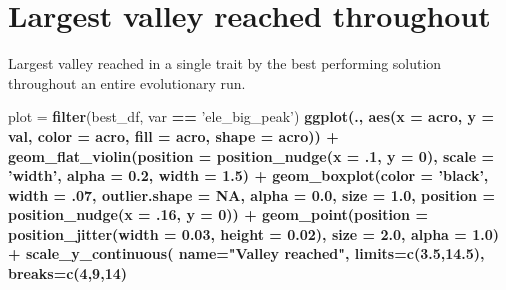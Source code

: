 \documentclass[]{book}
\newenvironment{Shaded}{\begin{snugshade}}{\end{snugshade}}
\newcommand{\DataTypeTok}[1]{\textcolor[rgb]{0.13,0.29,0.53}{#1}}
\newcommand{\DecValTok}[1]{\textcolor[rgb]{0.00,0.00,0.81}{#1}}
\newcommand{\FloatTok}[1]{\textcolor[rgb]{0.00,0.00,0.81}{#1}}
\newcommand{\KeywordTok}[1]{\textcolor[rgb]{0.13,0.29,0.53}{\textbf{#1}}}
\newcommand{\NormalTok}[1]{#1}
\newcommand{\OperatorTok}[1]{\textcolor[rgb]{0.81,0.36,0.00}{\textbf{#1}}}
\newcommand{\OtherTok}[1]{\textcolor[rgb]{0.56,0.35,0.01}{#1}}
\newcommand{\StringTok}[1]{\textcolor[rgb]{0.31,0.60,0.02}{#1}}
\begin{document}
\hypertarget{largest-valley-reached-throughout-3}{%
\section{Largest valley reached throughout}\label{largest-valley-reached-throughout-3}}

Largest valley reached in a single trait by the best performing solution throughout an entire evolutionary run.

\begin{Shaded}
\begin{Highlighting}[]
\NormalTok{plot =}\StringTok{ }\KeywordTok{filter}\NormalTok{(best_df, var }\OperatorTok{==}\StringTok{ 'ele_big_peak'}\NormalTok{) }\OperatorTok{%>%}
\StringTok{  }\KeywordTok{ggplot}\NormalTok{(., }\KeywordTok{aes}\NormalTok{(}\DataTypeTok{x =}\NormalTok{ acro, }\DataTypeTok{y =}\NormalTok{ val, }\DataTypeTok{color =}\NormalTok{ acro, }\DataTypeTok{fill =}\NormalTok{ acro, }\DataTypeTok{shape =}\NormalTok{ acro)) }\OperatorTok{+}
\StringTok{  }\KeywordTok{geom_flat_violin}\NormalTok{(}\DataTypeTok{position =} \KeywordTok{position_nudge}\NormalTok{(}\DataTypeTok{x =} \FloatTok{.1}\NormalTok{, }\DataTypeTok{y =} \DecValTok{0}\NormalTok{), }\DataTypeTok{scale =} \StringTok{'width'}\NormalTok{, }\DataTypeTok{alpha =} \FloatTok{0.2}\NormalTok{, }\DataTypeTok{width =} \FloatTok{1.5}\NormalTok{) }\OperatorTok{+}
\StringTok{  }\KeywordTok{geom_boxplot}\NormalTok{(}\DataTypeTok{color =} \StringTok{'black'}\NormalTok{, }\DataTypeTok{width =} \FloatTok{.07}\NormalTok{, }\DataTypeTok{outlier.shape =} \OtherTok{NA}\NormalTok{, }\DataTypeTok{alpha =} \FloatTok{0.0}\NormalTok{, }\DataTypeTok{size =} \FloatTok{1.0}\NormalTok{, }\DataTypeTok{position =} \KeywordTok{position_nudge}\NormalTok{(}\DataTypeTok{x =} \FloatTok{.16}\NormalTok{, }\DataTypeTok{y =} \DecValTok{0}\NormalTok{)) }\OperatorTok{+}
\StringTok{  }\KeywordTok{geom_point}\NormalTok{(}\DataTypeTok{position =} \KeywordTok{position_jitter}\NormalTok{(}\DataTypeTok{width =} \FloatTok{0.03}\NormalTok{, }\DataTypeTok{height =} \FloatTok{0.02}\NormalTok{), }\DataTypeTok{size =} \FloatTok{2.0}\NormalTok{, }\DataTypeTok{alpha =} \FloatTok{1.0}\NormalTok{) }\OperatorTok{+}
\StringTok{  }\KeywordTok{scale_y_continuous}\NormalTok{(}
    \DataTypeTok{name=}\StringTok{"Valley reached"}\NormalTok{,}
    \DataTypeTok{limits=}\KeywordTok{c}\NormalTok{(}\FloatTok{3.5}\NormalTok{,}\FloatTok{14.5}\NormalTok{),}
    \DataTypeTok{breaks=}\KeywordTok{c}\NormalTok{(}\DecValTok{4}\NormalTok{,}\DecValTok{9}\NormalTok{,}\DecValTok{14}\NormalTok{)}
}
\end{Highlighting}
\end{Shaded}
\end{document}
